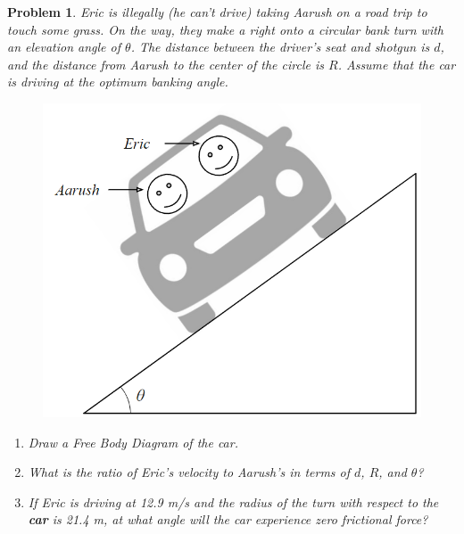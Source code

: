 \documentclass[12pt]{article}
\newcommand{\clearpts}{\addtocounter{tpts}{\value{cpts}} \setcounter{cpts}{0}}
\newcommand{\pts}[1]{\clearpts \setcounter{cpts}{#1}}
\theoremstyle{mystyle}
\newtheorem{pproblem}{Problem}
\begin{document}
\pts{10}
\begin{pproblem}
    Eric is illegally (he can't drive) taking Aarush on a road trip to touch some grass. On the way, they make a right onto a circular bank turn with an elevation angle of $\theta$. The distance between the driver's seat and shotgun is $d$, and the distance from Aarush to the center of the circle is $R$. Assume that the car is driving at the optimum banking angle.
    \begin{figure}[H]
        \centering
        \includegraphics[scale=0.7]{BankTurn.png}
    \end{figure}
    
    \begin{enumerate}[label=\alph*)]
        \item Draw a Free Body Diagram of the car.
        \item What is the ratio of Eric's velocity to Aarush's in terms of $d$, $R$, and $\theta$?
        \item If Eric is driving at 12.9 m/s and the radius of the turn with respect to the \textbf{car} is 21.4 m, at what angle will the car experience zero frictional force?
    \end{enumerate}
\end{pproblem}
\end{document}
